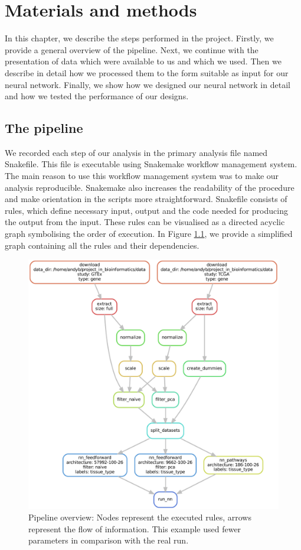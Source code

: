 \chapter{Materials and methods}
In this chapter, we describe the steps performed in the project.
Firstly, we provide a general overview of the pipeline. 
Next, we continue with the presentation of data which were available to us and which we used.
Then we describe in detail how we processed them to the form suitable as input for our neural network.
Finally, we show how we designed our neural network in detail and how we tested the performance of our designs.

\section{The pipeline}
We recorded each step of our analysis in the primary analysis file named Snakefile.
This file is executable using Snakemake workflow management system\cite{koster2012snakemake}.
The main reason to use this workflow management system was to make our analysis reproducible.
Snakemake also increases the readability of the procedure and make orientation in the scripts more straightforward.
Snakefile consists of rules, which define necessary input, output and the code needed for producing the output from the input.
These rules can be visualised as a directed acyclic graph symbolising the order of execution.
In Figure \ref{fig:dag}, we provide a simplified graph containing all the rules and their dependencies.

\begin{figure}
    \centering
    \includegraphics[width=\linewidth]{images/dag.pdf}
    \caption{Pipeline overview: Nodes represent the executed rules, arrows represent the flow of information. This example used fewer parameters in comparison with the real run.}
    \label{fig:dag}
\end{figure}

